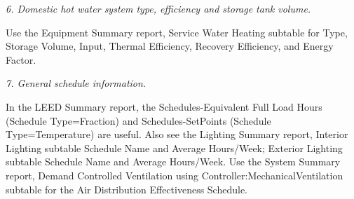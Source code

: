 \emph{6. Domestic hot water system type, efficiency and storage tank volume.}

Use the Equipment Summary report, Service Water Heating subtable for Type, Storage Volume, Input, Thermal Efficiency, Recovery Efficiency, and Energy Factor.

\emph{7. General schedule information.}

In the LEED Summary report, the Schedules-Equivalent Full Load Hours (Schedule Type=Fraction) and Schedules-SetPoints (Schedule Type=Temperature) are useful. Also see the Lighting Summary report, Interior Lighting subtable Schedule Name and Average Hours/Week; Exterior Lighting subtable Schedule Name and Average Hours/Week. Use the System Summary report, Demand Controlled Ventilation using Controller:MechanicalVentilation subtable for the Air Distribution Effectiveness Schedule.
